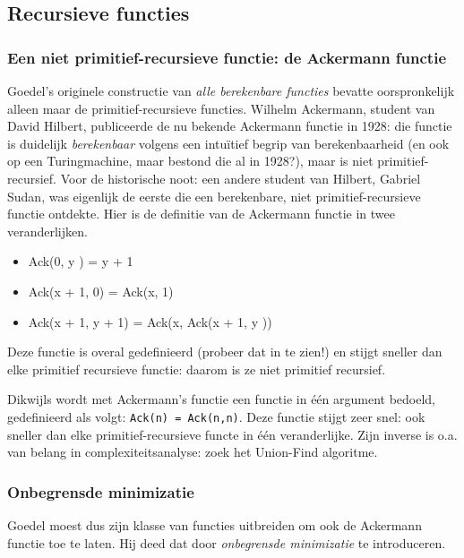 \subsection{Recursieve functies}

\subsubsection{Een niet primitief-recursieve functie: de Ackermann functie}

Goedel's originele constructie van {\em alle berekenbare functies}
bevatte oorspronkelijk alleen maar de primitief-recursieve functies.
Wilhelm Ackermann, student van David Hilbert, publiceerde de nu
bekende Ackermann functie in 1928: die functie is duidelijk {\em
berekenbaar} volgens een intu\"{i}tief begrip van berekenbaarheid (en
ook op een Turingmachine, maar bestond die al in 1928?), maar is
niet primitief-recursief. Voor de historische noot: een andere student
van Hilbert, Gabriel Sudan, was eigenlijk de eerste die een
berekenbare, niet primitief-recursieve functie ontdekte. Hier is de
definitie van de Ackermann functie in twee veranderlijken.

\begin{itemize}
\item[] Ack(0, y ) = y + 1
\item[] Ack(x + 1, 0) = Ack(x, 1)
\item[] Ack(x + 1, y + 1) = Ack(x, Ack(x + 1, y ))
\end{itemize}

Deze functie is overal gedefinieerd (probeer dat in te zien!) en
stijgt sneller dan elke primitief recursieve functie: daarom is ze
niet primitief recursief.


Dikwijls wordt met Ackermann's functie een functie in \'{e}\'{e}n
argument bedoeld, gedefinieerd als volgt: \verb|Ack(n) = Ack(n,n)|. Deze
functie stijgt zeer snel: ook sneller dan elke primitief-recursieve
functe in \'{e}\'{e}n veranderlijke. Zijn inverse is o.a. van belang
in complexiteitsanalyse: zoek het Union-Find algoritme.



\subsubsection{Onbegrensde minimizatie}

Goedel moest dus zijn klasse van functies uitbreiden om ook de
Ackermann functie toe te laten. Hij deed dat door {\em onbegrensde
minimizatie} te introduceren.

